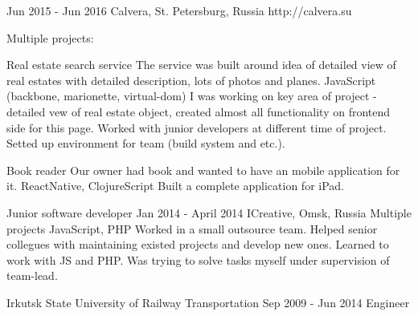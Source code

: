 \documentclass[11pt,a4paper,sans]{awesomecv}
\begin{document}
\begin{cventries}
    {Jun 2015 - Jun 2016}
    {Calvera, St. Petersburg, Russia}
    {http://calvera.su}
    {
      Multiple projects:\newline
      \begin{cvprojects}{0.8ex}
        \item \cvproject
            {Real estate search service}
            {}
            {The service was built around idea of detailed view of real estates with detailed description, lots of photos and planes.}
            {JavaScript (backbone, marionette, virtual-dom)}
            {
              I was working on key area of project - detailed vew of real estate object,
              created almost all functionality on frontend side for this page.
              Worked with junior developers at different time of project.
              Setted up environment for team (build system and etc.).
            }
        \item \cvproject
            {Book reader}
            {}
            {Our owner had book and wanted to have an mobile application for it.}
            {ReactNative, ClojureScript}
            {Built a complete application for iPad.}
      \end{cvprojects}
    }
\cventry
    {Junior software developer}
    {Jan 2014 - April 2014}
    {ICreative, Omsk, Russia}{}
    {
      Multiple projects\newline
      \vspace{0.8ex}
      \cvproject
          {}{}{}
          {JavaScript, PHP}
          {
            Worked in a small outsource team.
            Helped senior collegues with maintaining existed projects and develop new ones.
            Learned to work with JS and PHP. Was trying to solve tasks myself under supervision of team-lead.
          }
    }
\end{cventries}

\begin{cventries}
\cventry
    {Irkutsk State University of Railway Transportation}
    {Sep 2009 - Jun 2014}
    {Engineer}
    {}
    {}
\end{cventries}
\end{document}
